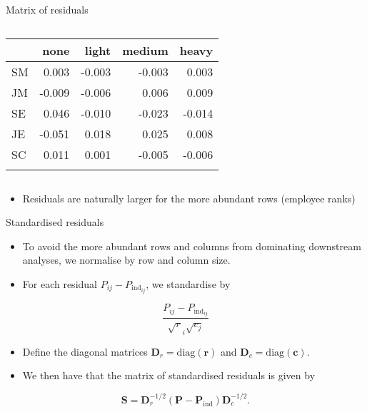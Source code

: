 \documentclass[
  ignorenonframetext,
  aspectratio=169]{beamer}
\providecommand{\tightlist}{%
  \setlength{\itemsep}{0pt}\setlength{\parskip}{0pt}}\usepackage{longtable,booktabs,array}
\begin{document}
\begin{frame}{Matrix of residuals}
\begin{columns}[T]
\begin{column}{0.525\textwidth}
\begin{longtable}[]{@{}lrrrr@{}}
\toprule\noalign{}
& none & light & medium & heavy \\
\midrule\noalign{}
\endhead
SM & 0.003 & -0.003 & -0.003 & 0.003 \\
JM & -0.009 & -0.006 & 0.006 & 0.009 \\
SE & 0.046 & -0.010 & -0.023 & -0.014 \\
JE & -0.051 & 0.018 & 0.025 & 0.008 \\
SC & 0.011 & 0.001 & -0.005 & -0.006 \\
\bottomrule\noalign{}
\end{longtable}
\end{column}
\end{columns}

\begin{itemize}
\tightlist
\item
  Residuals are naturally larger for the more abundant rows (employee
  ranks)
\end{itemize}
\end{frame}

\begin{frame}{Standardised residuals}
\protect\hypertarget{standardised-residuals}{}
\begin{itemize}
\tightlist
\item
  To avoid the more abundant rows and columns from dominating downstream
  analyses, we normalise by row and column size.
\item
  For each residual \(P_{ij} - P_{\mathrm{ind}}_{ij}\), we standardise
  by
\end{itemize}

\[
\frac{P_{ij} - P_{\mathrm{ind}}_{ij}}{\sqrt{r}_i\sqrt{c_j}}
\]

\begin{itemize}
\tightlist
\item
  Define the diagonal matrices \(\symbf{D}_r=\mathrm{diag}(\symbf{r})\)
  and \(\symbf{D}_c=\mathrm{diag}(\symbf{c})\).
\item
  We then have that the matrix of standardised residuals is given by
\end{itemize}

\[
\symbf{S} = \symbf{D}_r^{-1/2}(\symbf{P} - \symbf{P}_{\mathrm{ind}} ) \symbf{D}_c^{-1/2}.
\]
\end{frame}
\end{document}
